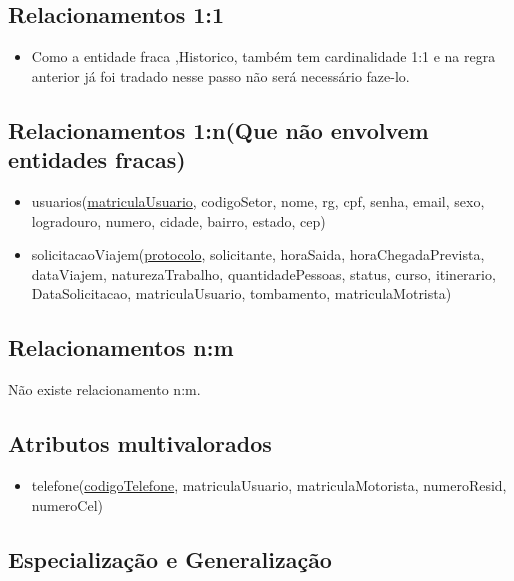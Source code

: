 \documentclass[11pt]{article}
\begin{document}
\subsection{Relacionamentos 1:1}
\begin{itemize}

\item Como a entidade fraca ,Historico, também tem cardinalidade 1:1 e na regra anterior já foi tradado nesse passo não será necessário faze-lo.
\end{itemize}

\subsection{Relacionamentos 1:n(Que não envolvem entidades fracas)}
\begin{itemize}

\item usuarios(\underline{matriculaUsuario}, codigoSetor, nome, rg, cpf, senha,
email, sexo, logradouro, numero, cidade, bairro, estado, cep)

\item solicitacaoViajem(\underline{protocolo}, solicitante, horaSaida, horaChegadaPrevista, dataViajem, naturezaTrabalho, quantidadePessoas, status, curso, itinerario, DataSolicitacao, matriculaUsuario, tombamento, matriculaMotrista)

\end{itemize}

\subsection{Relacionamentos n:m}
Não existe relacionamento n:m.

\subsection{Atributos multivalorados}
\begin{itemize}

\item telefone(\underline{codigoTelefone}, matriculaUsuario, matriculaMotorista, numeroResid, numeroCel)

\end{itemize}

\subsection{Especialização e Generalização}
\end{document}
